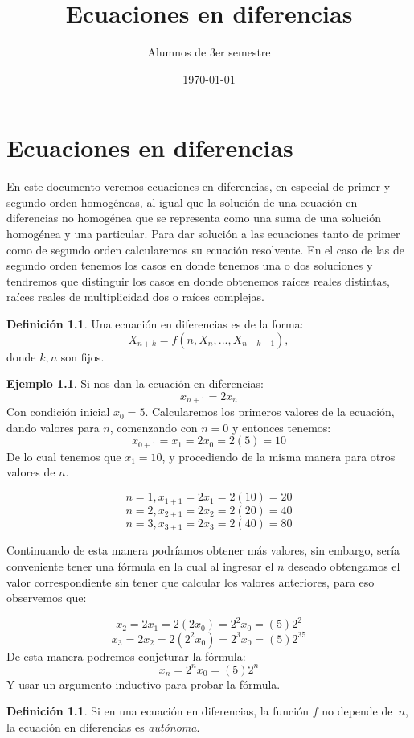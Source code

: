 \documentclass{report}
\title{Ecuaciones en diferencias}
\author{Alumnos de 3er semestre}
\date{\today}
\theoremstyle{definition}
\newtheorem{definicion}[teorema]{Definición}
\newtheorem{ejemplo}[teorema]{Ejemplo}
\begin{document}
\maketitle
\tableofcontents

\chapter{Ecuaciones en diferencias}
\label{sec:ecuaciones}

En este documento veremos ecuaciones en diferencias, en especial de
primer y segundo orden homogéneas, al igual que la solución de una
ecuación en diferencias no homogénea que se representa como una suma
de una solución homogénea y una particular. Para dar solución a las
ecuaciones tanto de primer como de segundo orden calcularemos su
ecuación resolvente.
En el caso de las de segundo orden tenemos los casos en donde tenemos una o dos soluciones y tendremos que distinguir los casos en donde obtenemos raíces reales distintas, raíces reales de multiplicidad dos o raíces complejas.

\begin{definicion}
Una ecuación en diferencias es de la forma:
$$X_{n+k}=f(n,X_n,...,X_{n+k-1}),$$
donde $k,n$ son fijos.
\end{definicion}

\begin{ejemplo}


Si nos dan la ecuación en diferencias:
$$x_{n+1}=2x_n$$
Con condición inicial  $x_0=5$. Calcularemos los primeros valores de la ecuación, dando valores para $n$, comenzando con $n=0$ y entonces tenemos:
$$x_{0+1}=x_1=2x_0=2(5)=10$$
De lo cual tenemos que $x_1=10$, y procediendo de la misma manera para otros valores de $n$.

 $$ n=1,  x_{1+1}=2x_1=2(10)=20$$
 $$ n=2,  x_{2+1}=2x_2=2(20)=40$$
 $$ n=3,  x_{3+1}=2x_3=2(40)=80$$

 Continuando de esta manera podríamos obtener más valores, sin embargo, sería conveniente
 tener una fórmula en la cual al ingresar el $n$ deseado obtengamos el valor correspondiente
 sin tener que calcular los valores anteriores, para eso observemos que:

 $$x_2=2x_1=2(2x_0)=2^2x_0=(5)2^2$$
 $$x_3=2x_2=2(2^2x_0)=2^3x_0=(5)2^35$$
 De esta manera podremos conjeturar la fórmula:
 $$x_n=2^nx_0=(5)2^n$$
 Y usar un argumento inductivo para probar la fórmula.
 \end{ejemplo}

\begin{definicion}
Si en una ecuación en diferencias, la función $f$ no depende de~$n$,
la ecuación en diferencias es \emph{autónoma}.
\end{definicion}
\end{document}
